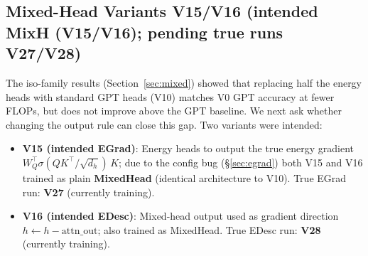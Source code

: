 \documentclass[11pt,a4paper]{article}
\begin{document}
\subsection{Mixed-Head Variants V15/V16 (intended MixH (V15/V16); pending true runs V27/V28)}

The iso-family results (Section~\ref{sec:mixed}) showed that replacing half the energy
heads with standard GPT heads (V10) matches V0 GPT accuracy at fewer FLOPs, but does not
improve above the GPT baseline.  We next ask whether changing the output rule can close
this gap.  Two variants were intended:

\begin{itemize}
  \item \textbf{V15 (intended EGrad)}: Energy heads to output the true energy gradient
    $W_Q^\top \sigma(QK^\top\!/\!\sqrt{d_h})\,K$; due to the config bug (\S\ref{sec:egrad})
    both V15 and V16 trained as plain \textbf{MixedHead} (identical architecture to V10).
    True EGrad run: \textbf{V27} (currently training).
  \item \textbf{V16 (intended EDesc)}: Mixed-head output used as gradient direction
    $h \leftarrow h - \mathrm{attn\_out}$; also trained as MixedHead.
    True EDesc run: \textbf{V28} (currently training).
\end{itemize}
\end{document}
